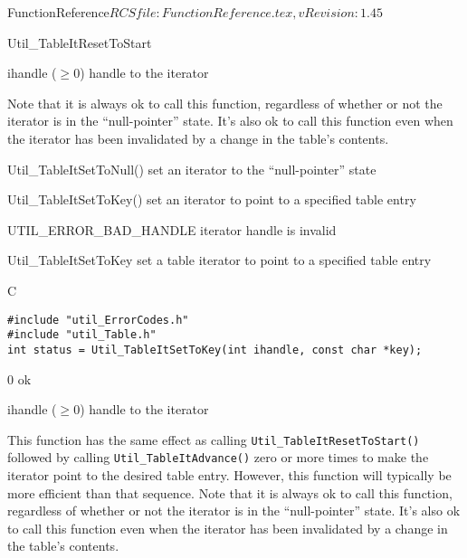 \begin{cactuspart}{5}{FunctionReference}{$RCSfile: FunctionReference.tex,v $}{$Revision: 1.45 $}
\begin{FunctionDescription}{Util\_TableItResetToStart}
\begin{Parameter}{ihandle ($\ge 0$)}
handle to the iterator
\end{Parameter}

\begin{Discussion}
Note that it is always ok to call this function, regardless of
whether or not the iterator is in the ``null-pointer'' state.
\NewPar
It's also ok to call this function even when the iterator has been
invalidated by a change in the table's contents.
\end{Discussion}

\begin{SeeAlso}{Util\_TableItSetToNull()}
set an iterator to the ``null-pointer'' state
\end{SeeAlso}
\begin{SeeAlso}{Util\_TableItSetToKey()}
set an iterator to point to a specified table entry
\end{SeeAlso}

\begin{Error}{UTIL\_ERROR\_BAD\_HANDLE}
iterator handle is invalid
\end{Error}
\end{FunctionDescription}


\begin{FunctionDescription}{Util\_TableItSetToKey}
\label{Util-TableItSetToKey}
set a table iterator to point to a specified table entry

\begin{Synopsis}{C}
\begin{verbatim}
#include "util_ErrorCodes.h"
#include "util_Table.h"
int status = Util_TableItSetToKey(int ihandle, const char *key);
\end{verbatim}
\end{Synopsis}

\begin{Result}{\rm 0}
ok
\end{Result}

\begin{Parameter}{ihandle ($\ge 0$)}
handle to the iterator
\end{Parameter}

\begin{Discussion}
This function has the same effect as calling \verb|Util_TableItResetToStart()|
followed by calling \verb|Util_TableItAdvance()| zero or more times
to make the iterator point to the desired table entry.  However, this
function will typically be more efficient than that sequence.
\NewPar
Note that it is always ok to call this function, regardless of
whether or not the iterator is in the ``null-pointer'' state.
\NewPar
It's also ok to call this function even when the iterator has been
invalidated by a change in the table's contents.
\end{Discussion}


\end{FunctionDescription}
\end{cactuspart}
